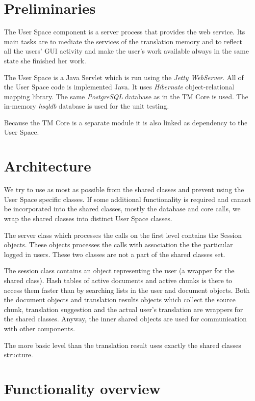 \section{Preliminaries}

The User Space component is a server process that provides the web service. Its main tasks are to mediate the services of the translation memory and to reflect all the users' GUI activity and make the user's work available always in the same state she finished her work.

The User Space is a Java Servlet which is run using the \emph{Jetty WebServer}. All of the User Space code is implemented Java. It uses \emph{Hibernate} object-relational mapping library. The same \emph{PostgreSQL} database as in the TM Core is used. The in-memory \emph{hsqldb} database is used for the unit testing.

Because the TM Core is a separate module it is also linked as dependency to the User Space.

\section{Architecture}

We try to use as most as possible from the shared classes and prevent using the User Space specific classes. If some additional functionality is required and cannot be incorporated into the shared classes, mostly the database and core calls, we wrap the shared classes into distinct User Space classes.

The server class which processes the calls on the first level contains the Session objects. These objects processes the calls with association the the particular logged in users. These two classes are not a part of the shared classes set.

The session class contains an object representing the user (a wrapper for the shared class). Hash tables of active documents and active chunks is there to access them faster than by searching lists in the user and document objects. Both the document objects and translation results objects which collect the source chunk, translation suggestion and the actual user's translation are wrappers for the shared classes. Anyway, the inner shared objects are used for communication with other components.

The more basic level than the translation result uses exactly the shared classes structure.

\section{Functionality overview}

